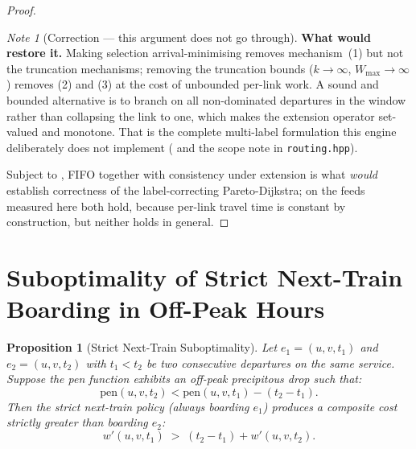 \documentclass[11pt, a4paper]{article}
\newtheorem{proposition}[theorem]{Proposition}
\theoremstyle{remark}
\newtheorem*{note}{Note}
\newcommand{\wmax}{W_{\max}}
\newcommand{\pen}{\mathrm{pen}}
\begin{document}
\begin{proof}
\begin{note}[Correction --- this argument does not go through]
    \textbf{What would restore it.} Making selection arrival-minimising removes
    mechanism~(1) but not the truncation mechanisms; removing the truncation
    bounds ($k \to \infty$, $\wmax \to \infty$) removes (2) and (3) at the cost of
    unbounded per-link work. A sound and bounded alternative is to branch on all
    non-dominated departures in the window rather than collapsing the link to one,
    which makes the extension operator set-valued and monotone. That is the
    complete multi-label formulation this engine deliberately does not implement
    ( and the scope note in \texttt{routing.hpp}).
    \end{note}

    Subject to , FIFO together with consistency under
    extension is what \emph{would} establish correctness of the label-correcting
    Pareto-Dijkstra; on the feeds measured here both hold, because per-link travel
    time is constant by construction, but neither holds in general.
\end{proof}

\section{Suboptimality of Strict Next-Train Boarding in Off-Peak Hours}

\begin{proposition}[Strict Next-Train Suboptimality]
    \label{prop:strict-suboptimal}
    Let $e_1 = (u, v, t_1)$ and $e_2 = (u, v, t_2)$ with $t_1 < t_2$ be two
    consecutive departures on the same service. Suppose the pen function
    exhibits an off-peak precipitous drop such that:
    \[
        \pen(u, v, t_2) < \pen(u, v, t_1) - (t_2 - t_1).
    \]
    Then the strict next-train policy (always boarding $e_1$) produces a
    composite cost strictly greater than boarding $e_2$:
    \[
        w'(u, v, t_1) \;>\; (t_2 - t_1) + w'(u, v, t_2).
    \]
\end{proposition}
\end{document}
